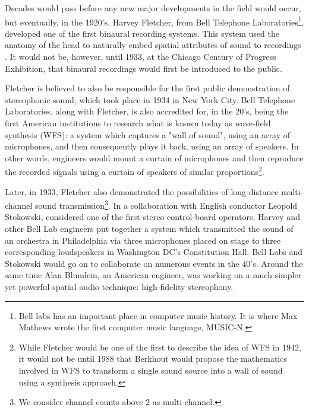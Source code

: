 Decades would pass before any new major developments in the field would occur, but eventually, in the 1920's, Harvey Fletcher, from Bell Telephone Laboratories\footnote{Bell labs has an important place in computer music history. It is where Max Mathews wrote the first computer music language, MUSIC-N.}, developed one of the first binaural recording systems. This system used the anatomy of the head to naturally embed spatial attributes of sound to recordings \cite{harvey1927binaural}. It would not be, however, until 1933, at the Chicago Century of Progress Exhibition, that binaural recordings would first be introduced to the public. 

Fletcher is believed to also be responsible for the first public demonstration of stereophonic sound, which took place in 1934 in New York City. Bell Telephone Laboratories, along with Fletcher, is also accredited for, in the 20's, being the first American institutions to research what is known today as wave-field synthesis (WFS): a system which captures a "wall of sound", using an array of microphones, and then consequently plays it back, using an array of speakers. In other words, engineers would mount a curtain of microphones and then reproduce the recorded signals using a curtain of speakers of similar proportions\cite{fletcher1942hearing}\footnote{While Fletcher would be one of the first to describe the idea of WFS in 1942, it would not be until 1988 that Berkhout would propose the mathematics involved in WFS to transform a single sound source into a wall of sound using a synthesis approach.}.

Later, in 1933, Fletcher also demonstrated the possibilities of long-distance multi-channel sound transmission\footnote{We consider channel counts above 2 as multi-channel.}. In a collaboration with English conductor Leopold Stokowski, considered one of the first stereo control-board operators\cite{mcginn1983stokowski}, Harvey and other Bell Lab engineers put together a system which transmitted the sound of an orchestra in Philadelphia via three microphones placed on stage to three corresponding loudspeakers in Washington DC's Constitution Hall. Bell Labs and Stokowski would go on to collaborate on numerous events in the 40's. Around the same time Alan Blumlein, an American engineer, was working on a much simpler yet powerful spatial audio technique: high-fidelity stereophony. 

